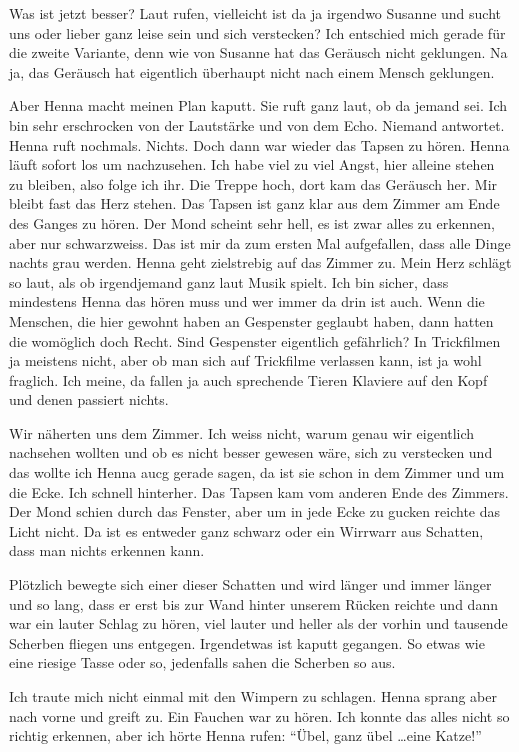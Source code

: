 Was ist jetzt besser? Laut rufen, vielleicht ist da ja irgendwo Susanne und sucht uns oder lieber ganz leise sein und sich verstecken? Ich entschied mich gerade für die zweite Variante, denn wie von Susanne hat das Geräusch nicht geklungen. Na ja, das Geräusch hat eigentlich überhaupt nicht nach einem Mensch geklungen.

Aber Henna macht meinen Plan kaputt. Sie ruft ganz laut, ob da jemand sei. Ich bin sehr erschrocken von der Lautstärke und von dem Echo. Niemand antwortet. Henna ruft nochmals. Nichts. Doch dann war wieder das Tapsen zu hören. Henna läuft sofort los um nachzusehen. Ich habe viel zu viel Angst, hier alleine stehen zu bleiben, also folge ich ihr. Die Treppe hoch, dort kam das Geräusch her. Mir bleibt fast das Herz stehen. Das Tapsen ist ganz klar aus dem Zimmer am Ende des Ganges zu hören. Der Mond scheint sehr hell, es ist zwar alles zu erkennen, aber nur schwarzweiss. Das ist mir da zum ersten Mal aufgefallen, dass alle Dinge nachts grau werden. Henna geht zielstrebig auf das Zimmer zu. Mein Herz schlägt so laut, als ob irgendjemand ganz laut Musik spielt. Ich bin sicher, dass mindestens Henna das hören muss und wer immer da drin ist auch. Wenn die Menschen, die hier gewohnt haben an Gespenster geglaubt haben, dann hatten die womöglich doch Recht. Sind Gespenster eigentlich gefährlich? In Trickfilmen ja meistens nicht, aber ob man sich auf Trickfilme verlassen kann, ist ja wohl fraglich. Ich meine, da fallen ja auch sprechende Tieren Klaviere auf den Kopf und denen passiert nichts. 

Wir näherten uns dem Zimmer. Ich weiss nicht, warum genau wir eigentlich nachsehen wollten und ob es nicht besser gewesen wäre, sich zu verstecken und das wollte ich Henna aucg gerade sagen, da ist sie schon in dem Zimmer und um die Ecke. Ich schnell hinterher. Das Tapsen kam vom anderen Ende des Zimmers. Der Mond schien durch das Fenster, aber um in jede Ecke zu gucken reichte das Licht nicht. Da ist es entweder ganz schwarz oder ein Wirrwarr aus Schatten, dass man nichts erkennen kann.

Plötzlich bewegte sich einer dieser Schatten und wird länger und immer länger und so lang, dass er erst bis zur Wand hinter unserem Rücken reichte und dann war ein lauter Schlag zu hören, viel lauter und heller als der vorhin und tausende Scherben fliegen uns entgegen. Irgendetwas ist kaputt gegangen. So etwas wie eine riesige Tasse oder so, jedenfalls sahen die Scherben so aus.

Ich traute mich nicht einmal mit den Wimpern zu schlagen. Henna sprang aber nach vorne und greift zu. Ein Fauchen war zu hören. Ich konnte das alles nicht so richtig erkennen, aber ich hörte Henna rufen: \enquote{Übel, ganz übel \dots eine Katze!}

